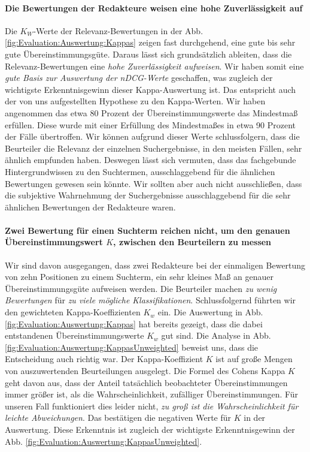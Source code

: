 \paragraph{Die Bewertungen der Redakteure weisen eine hohe Zuverlässigkeit auf} 
Die $K_W$-Werte der Relevanz-Bewertungen in der Abb. \ref{fig:Evaluation:Auswertung:Kappas} zeigen fast durchgehend, eine gute bis sehr gute Übereinstimmungsgüte. Daraus lässt sich grundsätzlich ableiten, dass die Relevanz-Bewertungen eine \textit{hohe Zuverlässigkeit aufweisen}. Wir haben somit eine \textit{gute Basis zur Auswertung der nDCG-Werte} geschaffen, was zugleich der wichtigste Erkenntnisgewinn dieser Kappa-Auswertung ist. Das entspricht auch der von uns aufgestellten Hypothese zu den Kappa-Werten. Wir haben angenommen das etwa 80 Prozent der Übereinstimmungswerte das Mindestmaß erfüllen. Diese wurde mit einer Erfüllung des Mindestmaßes in etwa 90 Prozent der Fälle übertroffen. Wir können aufgrund dieser Werte schlussfolgern, dass die Beurteiler die Relevanz der einzelnen Suchergebnisse, in den meisten Fällen, sehr ähnlich empfunden haben. Deswegen lässt sich vermuten, dass das fachgebunde Hintergrundwissen zu den Suchtermen, ausschlaggebend für die ähnlichen Bewertungen gewesen sein könnte. Wir sollten aber auch nicht ausschließen, dass die subjektive Wahrnehmung der Suchergebnisse ausschlaggebend für die sehr ähnlichen Bewertungen der Redakteure waren. 

\paragraph{Zwei Bewertung für einen Suchterm reichen nicht, um den genauen Übereinstimmungswert $K$, zwischen den Beurteilern zu messen} 
Wir sind davon ausgegangen, dass zwei Redakteure bei der einmaligen Bewertung von zehn Positionen zu einem Suchterm, ein sehr kleines Maß an genauer Übereinstimmungsgüte aufweisen werden. Die Beurteiler machen \textit{zu wenig Bewertungen} für \textit{zu viele mögliche Klassifikationen}. Schlussfolgernd führten wir den gewichteten Kappa-Koeffizienten $K_w$ ein. Die Auswertung in Abb. \ref{fig:Evaluation:Auswertung:Kappas} hat bereits gezeigt, dass die dabei entstandenen Übereinstimmungswerte $K_w$ gut sind. Die Analyse in Abb. \ref{fig:Evaluation:Auswertung:KappasUnweighted} beweist uns, dass die Entscheidung auch richtig war. Der Kappa-Koeffizient $K$ ist auf große Mengen von auszuwertenden Beurteilungen ausgelegt. Die Formel des Cohens Kappa $K$ geht davon aus, dass der Anteil tatsächlich beobachteter Übereinstimmungen immer größer ist, als die Wahrscheinlichkeit, zufälliger Übereinstimmungen. Für unseren Fall funktioniert dies leider nicht, \textit{zu groß ist die Wahrscheinlichkeit für leichte Abweichungen}. Das bestätigen die negativen Werte für $K$ in der Auswertung. Diese Erkenntnis ist zugleich der wichtigste Erkenntnisgewinn der Abb. \ref{fig:Evaluation:Auswertung:KappasUnweighted}.


